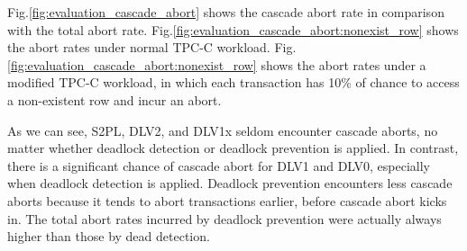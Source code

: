 \documentclass[conference]{IEEEtran}
\begin{document}
Fig.\ref{fig:evaluation_cascade_abort} shows the cascade abort rate in comparison with the total abort rate.
Fig.\ref{fig:evaluation_cascade_abort:nonexist_row}
shows the abort rates under normal TPC-C workload.
Fig.\ref{fig:evaluation_cascade_abort:nonexist_row} 
shows the abort rates under a modified TPC-C workload, in which each transaction has 10\% of chance to access a non-existent row and incur an abort. 
 
As we can see, S2PL, DLV2, and DLV1x seldom encounter cascade aborts, no matter whether deadlock detection or deadlock prevention is applied. 
In contrast, there is a significant chance of cascade abort for DLV1 and DLV0, especially when deadlock detection is applied. Deadlock prevention encounters less cascade aborts because it tends to abort transactions earlier, before cascade abort kicks in. The total abort rates incurred by deadlock prevention were actually always higher than those by dead detection.
\end{document}

